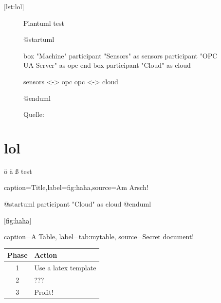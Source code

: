 \documentclass[%
    debug           = true,
    auto-generate   = true,
    print-ndn       = true,
    plantuml        = true
]{udhbwvst}
\begin{document}


\autoref{lst:lol}

\blindtext

\begin{figure}[h]
    \centering
    \caption{Plantuml test}
    \begin{plantuml}
        @startuml

        box "Machine"
            participant "Sensors" as sensors
            participant "OPC UA Server" as opc
        end box
        participant "Cloud" as cloud

        sensors <-> opc
        opc <-> cloud

        @enduml    
    \end{plantuml}
    \caption*{\footnotesize{Quelle: \cite[69]{example}}}
    \label{fig:plantuml_test}
\end{figure}

\section{lol}

 ö ä ß test

\lipsum

\begin{dhbwfigure}{caption=Title,label=fig:haha,source={Am Arsch!}}
    \begin{plantuml}
        @startuml
        participant "Cloud" as cloud
        @enduml            
    \end{plantuml}
\end{dhbwfigure}

\autoref{fig:haha}

\lipsum

\begin{dhbwtable}{%
    caption={A Table},
    label=tab:mytable,
    source={Secret document!}
}
    \begin{tabular}{ | c | l |}
        \hline
        \textbf{Phase}  & \textbf{Action}       \\ \hline
        1               & Use a latex template  \\ \hline
        2               & ???                   \\ \hline
        3               & Profit!               \\ \hline
    \end{tabular}
\end{dhbwtable}

\lipsum


\lipsum
\end{document}
